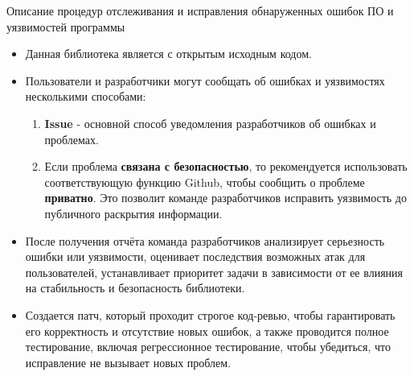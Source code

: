 \documentclass[10pt]{beamer}
\begin{document}
\begin{frame}{Описание процедур отслеживания и исправления обнаруженных ошибок ПО и уязвимостей программы}

    \begin{itemize}
        \item Данная библиотека является с открытым исходным кодом.

        \item Пользователи и разработчики могут сообщать об ошибках и уязвимостях несколькими способами:

        \begin{enumerate}
            \item \textbf{Issue} - основной способ уведомления разработчиков об ошибках и проблемах.
            \item Если проблема \textbf{связана с безопасностью}, то рекомендуется использовать соответствующую функцию Github, чтобы сообщить о проблеме \textbf{приватно}. Это позволит команде разработчиков исправить уязвимость до публичного раскрытия информации.
        \end{enumerate}

        \item После получения отчёта команда разработчиков анализирует серьезность ошибки или уязвимости, оценивает последствия возможных атак для пользователей, устанавливает приоритет задачи в зависимости от ее влияния на стабильность и безопасность библиотеки.

        \item Создается патч, который проходит строгое код-ревью, чтобы гарантировать его корректность и отсутствие новых ошибок, а также проводится полное тестирование, включая регрессионное тестирование, чтобы убедиться, что исправление не вызывает новых проблем.

    \end{itemize}
\end{frame}
\end{document}
